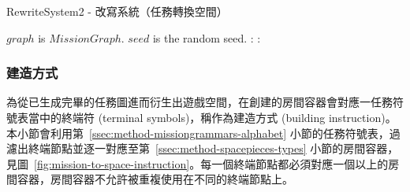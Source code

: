 \begin{algorithm}[ht]
    \caption{RewriteSystem2 - 改寫系統（任務轉換空間）}
    \label{alg:algorithm-mission-to-space-rewritesystem}
    \begin{algorithmic}[1]
        \Require
            \Statex $graph$ is $MissionGraph$.
            \Statex $seed$ is the random seed.
        \Ensure
            :                             
                           
                \EndIf
            \EndFor
            :            
                           
                \EndIf
            \EndFor \\
                                                                    
        \Statex
    \end{algorithmic}
\end{algorithm}

\subsubsection{建造方式}
\label{sssec:method-spacepieces-frommissiontospace-instruction}

為從已生成完畢的任務圖進而衍生出遊戲空間，在創建的房間容器會對應一任務符號表當中的終端符 (terminal symbols)，稱作為建造方式 (building instruction)。本小節會利用第~\ref{ssec:method-missiongrammars-alphabet} 小節的任務符號表，過濾出終端節點並逐一對應至第~\ref{ssec:method-spacepieces-types} 小節的房間容器，見圖~\ref{fig:mission-to-space-instruction}。每一個終端節點都必須對應一個以上的房間容器，房間容器不允許被重複使用在不同的終端節點上。

